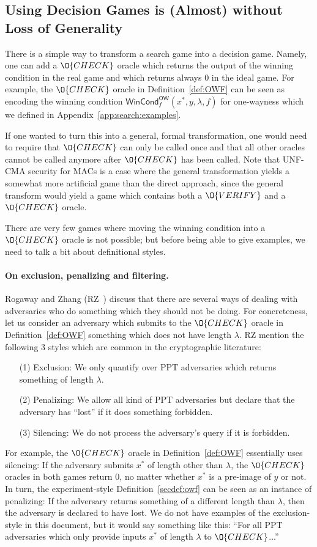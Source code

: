 \subsection{Using Decision Games is (Almost) without Loss of Generality}\label{app:search:discussion}
There is a simple way to transform a search game into a decision game.
Namely, one can add a $\O{CHECK}$ oracle which returns the output of the winning condition
in the real game and which returns always $0$ in the ideal game. For example, the $\O{CHECK}$ oracle
in Definition~\ref{def:OWF} can be seen as encoding the winning condition $\mathsf{WinCond}_f^\mathsf{OW}(x^*,y,\lambda,f)$
for one-wayness which we defined in Appendix~\ref{app:search:examples}.

If one wanted to turn this into a general, formal transformation, one would
need to require that $\O{CHECK}$ can only be called once and that all other oracles cannot be
called anymore after $\O{CHECK}$ has been called. Note that UNF-CMA security for MACs is a case where
the general transformation yields a somewhat more artificial game than the direct approach, since the
general transform would yield a game which contains both a $\O{VERIFY}$ and a $\O{CHECK}$ oracle.

There are very few games where moving the winning condition into a $\O{CHECK}$ oracle is not possible;
but before being able to give examples, we need to talk a bit about definitional styles.


\paragraph{On exclusion, penalizing and filtering.}
Rogaway and Zhang (RZ~\cite{RZ18}) discuss that there are several ways of dealing with adversaries who do something
which they should not be doing. For concreteness, let us consider an adversary which submits to the $\O{CHECK}$ oracle
in Definition~\ref{def:OWF} something which does not have length $\lambda$. RZ mention the following 3 styles which
are common in the cryptographic literature:
\begin{itemize}
\item[(1)] Exclusion: We only quantify over PPT adversaries which returns something of length $\lambda$.
\item[(2)] Penalizing: We allow all kind of PPT adversaries but declare that the adversary has ``lost'' if it does something forbidden.
\item[(3)] Silencing: We do not process the adversary's query if it is forbidden.
\end{itemize}
For example, the $\O{CHECK}$ oracle in Definition~\ref{def:OWF} essentially uses silencing: If the adversary submits $x^*$ of length other than $\lambda$, the $\O{CHECK}$ oracles in both games return $0$, no matter whether $x^*$ is a pre-image of $y$ or not. In turn, the experiment-style Definition~\ref{secdef:owf} can be seen as an instance of penalizing: If the adversary returns
something of a different length than $\lambda$, then the adversary is declared to have lost. We do not have examples of the exclusion-style in this document, but it would say something like this: ``For all PPT adversaries which only provide inputs $x^*$ of length $\lambda$ to $\O{CHECK}$...''


